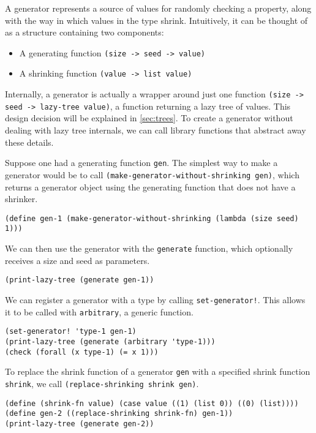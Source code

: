\documentclass{scrartcl}
\begin{document}
A generator represents a source of values for randomly checking a property,
along with the way in which values in the type shrink.
Intuitively, it can be thought of as a structure containing two components:
\begin{itemize}
\item A generating function \verb|(size -> seed -> value)|
\item A shrinking function \verb|(value -> list value)|
\end{itemize}
Internally, a generator is actually a wrapper around just one function
\verb|(size -> seed -> lazy-tree value)|, a function returning a lazy tree of
values. This design decision will be explained in
\cref{sec:trees}.
To create a generator without dealing with lazy tree internals,
we can call library functions that abstract away these details.

Suppose one had a generating function \verb|gen|. The simplest way to make a
generator would be to call \verb|(make-generator-without-shrinking gen)|,
which returns a generator object using the generating function that does not
have a shrinker.
\begin{verbatim}
(define gen-1 (make-generator-without-shrinking (lambda (size seed) 1)))
\end{verbatim}

We can then use the generator with the \verb|generate| function,
which optionally receives a size and seed as parameters.
\begin{verbatim}
(print-lazy-tree (generate gen-1))
\end{verbatim}

We can register a generator with a type by calling \verb|set-generator!|. This
allows it to be called with \verb|arbitrary|, a generic function.

\begin{verbatim}
(set-generator! 'type-1 gen-1)
(print-lazy-tree (generate (arbitrary 'type-1)))
(check (forall (x type-1) (= x 1)))
\end{verbatim}

To replace the shrink function of a generator \verb|gen| with a specified shrink
function \verb|shrink|, we call \verb|(replace-shrinking shrink gen)|.

\begin{verbatim}
(define (shrink-fn value) (case value ((1) (list 0)) ((0) (list))))
(define gen-2 ((replace-shrinking shrink-fn) gen-1))
(print-lazy-tree (generate gen-2))
\end{verbatim}
\end{document}

